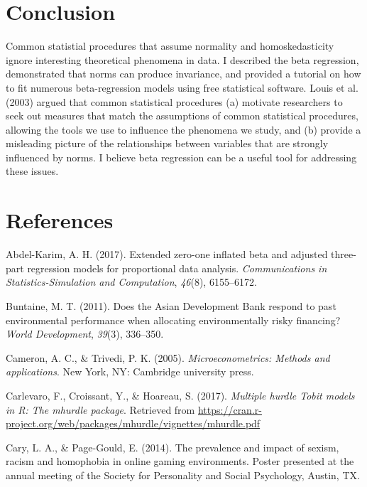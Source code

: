 \documentclass[english,man]{apa6}
\theoremstyle{definition}
\theoremstyle{definition}
\theoremstyle{remark}
\begin{document}
\section{Conclusion}\label{conclusion}

Common statistial procedures that assume normality and homoskedasticity
ignore interesting theoretical phenomena in data. I described the beta
regression, demonstrated that norms can produce invariance, and provided
a tutorial on how to fit numerous beta-regression models using free
statistical software. Louis et al. (2003) argued that common statistical
procedures (a) motivate researchers to seek out measures that match the
assumptions of common statistical procedures, allowing the tools we use
to influence the phenomena we study, and (b) provide a misleading
picture of the relationships between variables that are strongly
influenced by norms. I believe beta regression can be a useful tool for
addressing these issues.

\newpage

\section{References}\label{references}

\setlength{\parindent}{-0.5in} \setlength{\leftskip}{0.5in}

\hypertarget{refs}{}
\hypertarget{ref-abdel2017extended}{}
Abdel-Karim, A. H. (2017). Extended zero-one inflated beta and adjusted
three-part regression models for proportional data analysis.
\emph{Communications in Statistics-Simulation and Computation},
\emph{46}(8), 6155--6172.

\hypertarget{ref-buntaine2011does}{}
Buntaine, M. T. (2011). Does the Asian Development Bank respond to past
environmental performance when allocating environmentally risky
financing? \emph{World Development}, \emph{39}(3), 336--350.

\hypertarget{ref-cameron2005microeconometrics}{}
Cameron, A. C., \& Trivedi, P. K. (2005). \emph{Microeconometrics:
Methods and applications}. New York, NY: Cambridge university press.

\hypertarget{ref-carlevaro2016multiple}{}
Carlevaro, F., Croissant, Y., \& Hoareau, S. (2017). \emph{Multiple
hurdle Tobit models in R: The mhurdle package}. Retrieved from
\url{https://cran.r-project.org/web/packages/mhurdle/vignettes/mhurdle.pdf}

\hypertarget{ref-cary2014prevalence}{}
Cary, L. A., \& Page-Gould, E. (2014). The prevalence and impact of
sexism, racism and homophobia in online gaming environments. Poster
presented at the annual meeting of the Society for Personality and
Social Psychology, Austin, TX.
\end{document}
